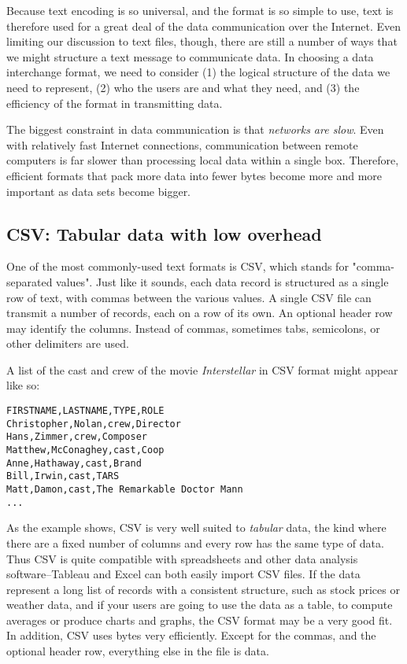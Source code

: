\documentclass[11pt]{book}
\newcommand{\term}[1]{\emph{#1}} %
\begin{document}
Because text encoding is so universal, and the format is so simple to use, text is therefore used for a great deal of the data communication over the Internet.  Even limiting our discussion to text files, though, there are still a number of ways that we might structure a text message to communicate data.  In choosing a data interchange format, we need to consider (1) the logical structure of the data we need to represent, (2) who the users are and what they need, and (3) the efficiency of the format in transmitting data.

The biggest constraint in data communication is that \emph{networks are slow}.  Even with relatively fast Internet connections, communication between remote computers is far slower than processing local data within a single box.  Therefore, efficient formats that pack more data into fewer bytes become more and more important as data sets become bigger.

\subsection{CSV: Tabular data with low overhead}

One of the most commonly-used text formats is CSV, which stands for "comma-separated values".  Just like it sounds, each data record is structured as a single row of text, with commas between the various values.  A single CSV file can transmit a number of records, each on a row of its own.  An optional header row may identify the columns.  Instead of commas, sometimes tabs, semicolons, or other delimiters are used.

A list of the cast and crew of the movie \textit{Interstellar} in CSV format might appear like so:

\begin{verbatim}
FIRSTNAME,LASTNAME,TYPE,ROLE
Christopher,Nolan,crew,Director
Hans,Zimmer,crew,Composer
Matthew,McConaghey,cast,Coop
Anne,Hathaway,cast,Brand
Bill,Irwin,cast,TARS
Matt,Damon,cast,The Remarkable Doctor Mann
...
\end{verbatim}

As the example shows, CSV is very well suited to \term{tabular} data, the kind where there are a fixed number of columns and every row has the same type of data.  Thus CSV is quite compatible with spreadsheets and other data analysis software--Tableau and Excel can both easily import CSV files.  If the data represent a long list of records with a consistent structure, such as stock prices or weather data, and if your users are going to use the data as a table, to compute averages or produce charts and graphs, the CSV format may be a very good fit.  In addition, CSV uses bytes very efficiently.  Except for the commas, and the optional header row, everything else in the file is data.
\end{document}
